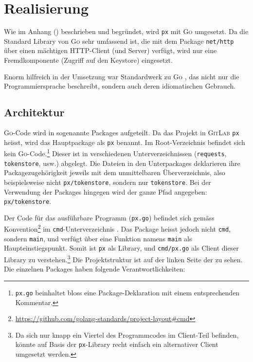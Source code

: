 \section{Realisierung}
\label{sec:Realisierung}

Wie im Anhang () beschrieben und begründet, wird \texttt{px} mit \textsc{Go} umgesetzt. Da die Standard Library von \textsc{Go} sehr umfassend ist, die mit dem Package \texttt{net/http} über einen mächtigen HTTP-Client (und Server) verfügt, wird nur eine Fremdkomponente (Zugriff auf den Keystore) eingesetzt.

Enorm hilfreich in der Umsetzung war Standardwerk zu \textsc{Go} \cite{gopl}, das nicht nur die Programmiersprache beschreibt, sondern auch deren idiomatischen Gebrauch.

\subsection{Architektur}

\textsc{Go}-Code wird in sogenannte Packages aufgeteilt. Da das Projekt in \textsc{GitLab} \texttt{px} heisst, wird das Hauptpackage als \texttt{px} benannt. Im Root-Verzeichnis befindet sich kein \textsc{Go}-Code.\footnote{\texttt{px.go} beinhaltet bloss eine Package-Deklaration mit einem entsprechenden Kommentar.} Dieser ist in verschiedenen Unterverzeichnissen (\texttt{requests}, \texttt{tokenstore}, usw.) abgelegt. Die Dateien in den Unterpackages deklarieren ihre Packagezugehörigkeit jeweils mit dem unmittelbaren Überverzeichnis, also beispielsweise nicht \texttt{px/tokenstore}, sondern nur \texttt{tokenstore}. Bei der Verwendung der Packages hingegen wird der ganze Pfad angegeben: \texttt{px/tokenstore}.

Der Code für das ausführbare Programm (\texttt{px.go}) befindet sich gemäss Konvention\footnote{\url{https://github.com/golang-standards/project-layout\#cmd}} im \texttt{cmd}-Unterverzeichnis \cite[S. 12]{powerful-cli-apps-in-go}. Das Package heisst jedoch nicht \texttt{cmd}, sondern \texttt{main}, und verfügt über eine Funktion namens \texttt{main} als Haupteinstiegspunkt. Somit ist \texttt{px} als Library, und \texttt{cmd/px.go} als Client dieser Library zu verstehen.\footnote{Da sich nur knapp ein Viertel des Programmcodes im Client-Teil befinden, könnte auf Basis der \texttt{px}-Library recht einfach ein alternativer Client umgesetzt werden.} Die Projektstruktur ist auf der linken Seite der  zu sehen. Die einzelnen Packages haben folgende Verantwortlichkeiten:

